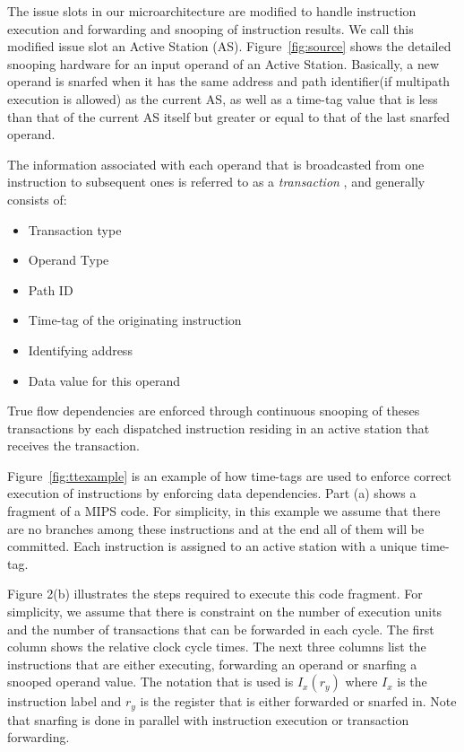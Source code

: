 \documentclass[10pt,twocolumn]{IEEEtran}
\begin{document}
\begin{figure*}[th]
\centering
{}
\caption{Example instruction exectuion.}
\label{fig:ttexample}
\end{figure*}  

The issue slots in our microarchitecture are modified to handle
instruction execution and forwarding and snooping of instruction
results.  We call this modified issue slot an Active Station (AS).
Figure~\ref{fig:source} shows the detailed snooping hardware for an
input operand of an Active Station. Basically, a new operand is snarfed
when it has the same address and path identifier(if multipath execution
is allowed) as the current AS, as well as a time-tag value that is less
than that of the current AS itself but greater or equal to that of the
last snarfed operand.

The information associated with each operand that is broadcasted from
one instruction to subsequent ones is referred to as a
\emph{transaction} , and generally consists of:

\begin{itemize}
\item Transaction type
\item Operand Type
\item Path ID
\item Time-tag of the originating instruction
\item Identifying address
\item Data value for this operand
\end{itemize}

True flow dependencies are enforced through continuous snooping of
theses transactions by each dispatched instruction residing in an
active station that receives the transaction.

Figure~\ref{fig:ttexample}  is an example of how time-tags are used to
enforce correct execution of instructions by enforcing data
dependencies.  Part (a) shows a fragment of a MIPS code.  For
simplicity, in this example we assume that there are no branches among
these instructions and at the end all of them will be committed.  Each
instruction is assigned to an active station with a unique time-tag.

Figure 2(b) illustrates the steps required to execute this code
fragment.  For simplicity, we assume that there is constraint on the
number of execution units and the number of transactions that can be
forwarded in each cycle.  The first column shows the relative clock
cycle times.  The next three columns list the instructions that are
either executing, forwarding an operand or snarfing a snooped operand
value.  The notation that is used is $I_x(r_y)$ where $I_x$ is the
instruction label and $r_y$ is the register that is either forwarded or
snarfed in.  Note that snarfing is done in parallel with instruction
execution or transaction forwarding.
\end{document}
